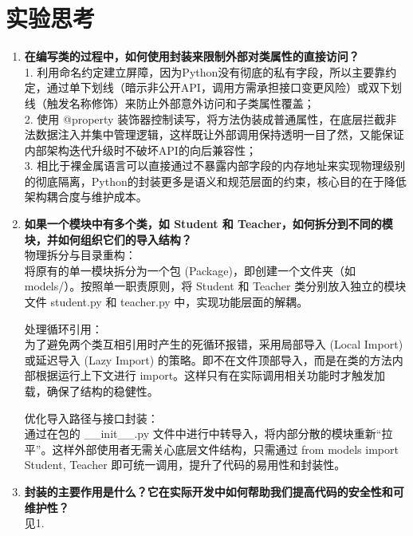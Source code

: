 \documentclass[12pt,a4paper]{ctexart}
\begin{document}
	\section{实验思考}
	\noindent \begin{enumerate}
	\item \textbf{在编写类的过程中，如何使用封装来限制外部对类属性的直接访问？}\\
		1. 利用命名约定建立屏障，因为Python没有彻底的私有字段，所以主要靠约定，通过单下划线（暗示非公开API，调用方需承担接口变更风险）或双下划线（触发名称修饰）来防止外部意外访问和子类属性覆盖；\\
		2. 使用 @property 装饰器控制读写，将方法伪装成普通属性，在底层拦截非法数据注入并集中管理逻辑，这样既让外部调用保持透明一目了然，又能保证内部架构迭代升级时不破坏API的向后兼容性；\\
		3. 相比于裸金属语言可以直接通过不暴露内部字段的内存地址来实现物理级别的彻底隔离，Python的封装更多是语义和规范层面的约束，核心目的在于降低架构耦合度与维护成本。
	
	\item \textbf{如果一个模块中有多个类，如 Student 和 Teacher，如何拆分到不同的模块，并如何组织它们的导入结构？}\\
	物理拆分与目录重构：\\
	将原有的单一模块拆分为一个包 (Package)，即创建一个文件夹（如 models/）。按照单一职责原则，将 Student 和 Teacher 类分别放入独立的模块文件 student.py 和 teacher.py 中，实现功能层面的解耦。
	
	处理循环引用：\\
	为了避免两个类互相引用时产生的死循环报错，采用局部导入 (Local Import) 或延迟导入 (Lazy Import) 的策略。即不在文件顶部导入，而是在类的方法内部根据运行上下文进行 import。这样只有在实际调用相关功能时才触发加载，确保了结构的稳健性。
	
	优化导入路径与接口封装：\\
	通过在包的 \_\_init\_\_.py 文件中进行中转导入，将内部分散的模块重新“拉平”。这样外部使用者无需关心底层文件结构，只需通过 from models import Student, Teacher 即可统一调用，提升了代码的易用性和封装性。
		
		
	
	\item \textbf{封装的主要作用是什么？它在实际开发中如何帮助我们提高代码的安全性和可维护性？}\\
	见1.
	\end{enumerate}
	
\end{document}
